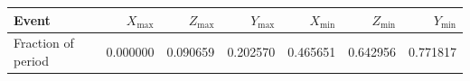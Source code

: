 \begin{tabular}{lrrrrrr}
\toprule
Event & $X_{\max}$ & $Z_{\max}$ & $Y_{\max}$ & $X_{\min}$ & $Z_{\min}$ & $Y_{\min}$ \\
\midrule
Fraction of period & 0.000000 & 0.090659 & 0.202570 & 0.465651 & 0.642956 & 0.771817\\
\bottomrule
\end{tabular}
